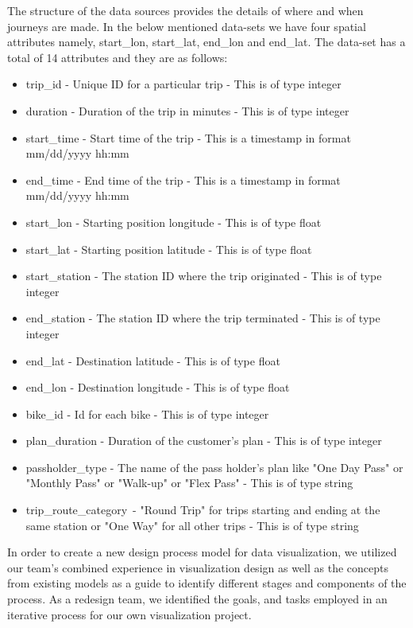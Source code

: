 The structure of the data sources provides the details of where and when journeys are made. In the below mentioned data-sets we have four spatial attributes namely, start\_lon, start\_lat, end\_lon and end\_lat. The data-set has a total of 14 attributes and they are as follows: 
\begin{itemize}
    \item trip\_id - Unique ID for a particular trip - This is of type integer
    \item duration - Duration of the trip in minutes - This is of type integer
    \item start\_time - Start time of the trip - This is a timestamp in format mm/dd/yyyy hh:mm
    \item end\_time - End time of the trip - This is a timestamp in format mm/dd/yyyy hh:mm
    \item start\_lon - Starting position longitude - This is of type float
    \item start\_lat - Starting position latitude - This is of type float
    \item start\_station - The station ID where the trip originated - This is of type integer
    \item end\_station -  The station ID where the trip terminated - This is of type integer
    \item end\_lat - Destination latitude - This is of type float
    \item end\_lon - Destination longitude - This is of type float
    \item bike\_id - Id for each bike - This is of type integer
    \item plan\_duration - Duration of the customer's plan - This is of type integer
    \item passholder\_type - The name of the pass holder's plan like "One Day Pass" or "Monthly Pass" or "Walk-up" or "Flex Pass" - This is of type string
    \item trip\_route\_category\ -  "Round Trip" for trips starting and ending at the same station or "One Way" for all other trips - This is of type string
\end{itemize}

In order to create a new design process model for data visualization, we utilized our team’s combined experience in visualization design as well as the concepts from existing models as a guide to identify different stages and components of the process. As a redesign team, we identified the goals, and tasks employed in an iterative process for our own visualization project. 

